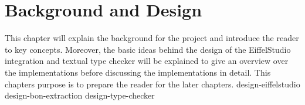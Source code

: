 \chapter{Background and Design}
This chapter will explain the background for the project and introduce the reader to key concepts. Moreover, the basic ideas behind the design of the EiffelStudio integration and textual \bon{} type checker will be explained to give an overview over the implementations before discussing the implementations in detail. This chapters purpose is to prepare the reader for the later chapters.
{design-eiffelstudio}
{design-bon-extraction}
{design-type-checker}